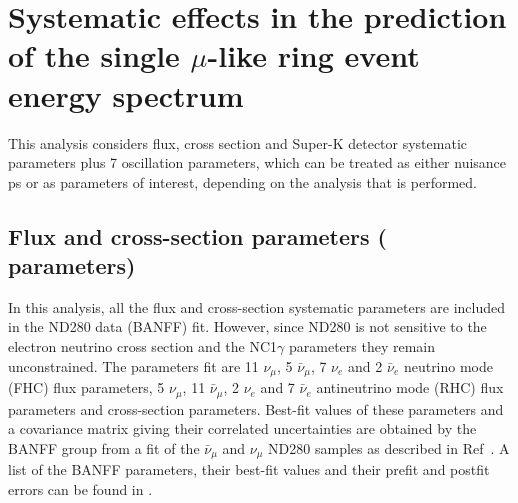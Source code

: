 \clearpage

\section {Systematic effects in the prediction of the single $\mu$-like ring event energy spectrum}
\label{sec:systematics}

This analysis considers \NSyst{} flux, cross section and Super-K detector systematic parameters plus 7 oscillation parameters, which can be treated as either nuisance ps or as parameters of interest, depending on the analysis that is performed.

\subsection{Flux and cross-section parameters (\NFluxAndXsecSyst{} parameters)}

In this analysis, all the flux and cross-section systematic parameters are included in the ND280 data (BANFF) fit. However, since ND280 is not sensitive to the electron neutrino cross section and the NC1$\gamma$ parameters they remain unconstrained. The parameters fit are 11 $\nu_{\mu}$, 5 $\bar{\nu}_{\mu}$, 7 $\nu_{e}$ and 2 $\bar{\nu}_{e}$ neutrino mode (FHC) flux parameters, 5 $\nu_{\mu}$, 11 $\bar{\nu}_{\mu}$, 2 $\nu_{e}$ and 7 $\bar{\nu}_{e}$ antineutrino mode (RHC) flux parameters and \NXsecSyst{} cross-section parameters. Best-fit values of these parameters and a covariance matrix giving their correlated uncertainties are obtained by the BANFF group from a fit of the $\bar{\nu}_\mu$ and $\nu_\mu$ ND280 samples as described in Ref~\cite{BANFF2017}. A list of the BANFF parameters, their best-fit values and their prefit and postfit errors can be found in .

\begin{table}
	
	\caption{Summary of neutrino mode flux systematics included in the VALOR joint fit analysis. A description of how the BANFF fit constrained these systematics can be found in \cite{BANFF2017}.}
	\label{tab:sys_flux_fhc_err}
\end{table}

\begin{table}
	
	\caption{Summary of antineutrino mode flux systematics included in the VALOR joint fit analysis. A description of how the BANFF fit constrained these systematics can be found in \cite{BANFF2017}.}
	\label{tab:sys_flux_rhc_err}
\end{table}


